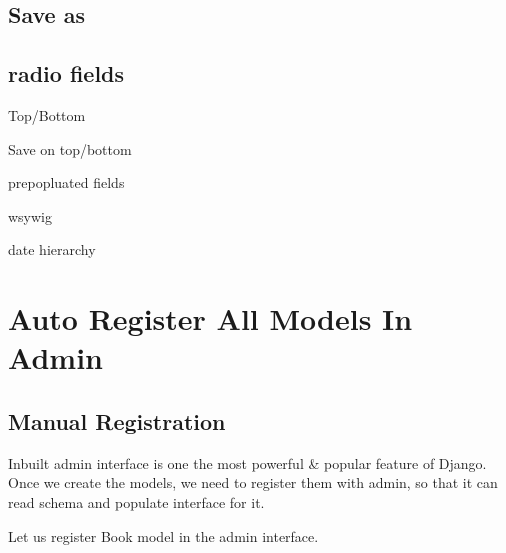 \documentclass[letterpaper,12pt,english]{sphinxmanual}
\begin{document}
\section{Save as}
\label{\detokenize{admin_better_defaults:save-as}}

\section{radio fields}
\label{\detokenize{admin_better_defaults:radio-fields}}
Top/Bottom

Save on top/bottom

prepopluated fields

wsywig

date hierarchy


\chapter{Auto Register All Models In Admin}
\label{\detokenize{admin_auto_register_models:auto-register-all-models-in-admin}}\label{\detokenize{admin_auto_register_models::doc}}

\section{Manual Registration}
\label{\detokenize{admin_auto_register_models:manual-registration}}
Inbuilt admin interface is one the most powerful \& popular feature of Django. Once we create the models, we need to register them with admin, so that it can read schema and populate interface for it.

Let us register Book model in the admin interface.

\begin{sphinxVerbatim}[commandchars=\\\{\}]

   

   


 
        


 
\end{sphinxVerbatim}
\end{document}
